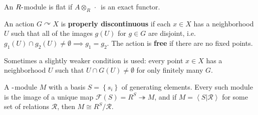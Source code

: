 
\begin{definition}

\end{definition}


\begin{definition}[Flat]

An \(R{\hbox{-}}\)module is flat if \(A\otimes_{R} {\,\cdot\,}\) is an
exact functor.

\end{definition}

\begin{definition}

An action \(G\curvearrowright X\) is \textbf{properly discontinuous} if
each \(x\in X\) has a neighborhood \(U\) such that all of the images
\(g(U)\) for \(g\in G\) are disjoint,
i.e.~\(g_1(U) \cap g_2(U) \neq \emptyset \implies g_1 = g_2\). The
action is \textbf{free} if there are no fixed points.

Sometimes a slightly weaker condition is used: every point \(x\in X\)
has a neighborhood \(U\) such that \(U \cap G(U) \neq \emptyset\) for
only finitely many \(G\).

\end{definition}


\begin{definition}

A \({\hbox{-}}\)module \(M\) with a basis \(S = \left\{{s_{i}}\right\}\)
of generating elements. Every such module is the image of a unique map
\(\mathcal{F}(S) = R^S \twoheadrightarrow M\), and if
\(M = \left< S \mathrel{\Big|}\mathcal{R} \right>\) for some set of
relations \(\mathcal{R}\), then \(M \cong R^S / \mathcal{R}\).

\end{definition}

\begin{definition}

\end{definition}


\begin{definition}

\end{definition}

